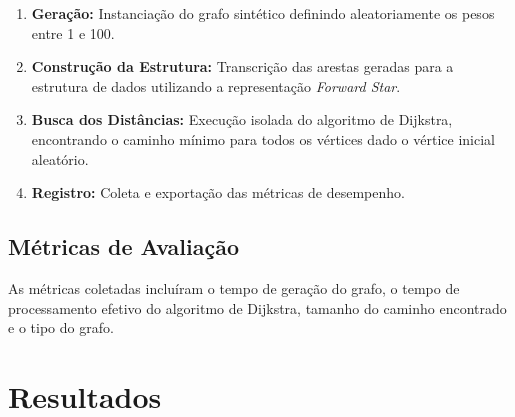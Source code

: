\documentclass[12pt]{article}
\begin{document}
\begin{enumerate}
    \item \textbf{Geração:} Instanciação do grafo sintético definindo aleatoriamente os pesos entre 1 e 100.
    
    \item \textbf{Construção da Estrutura:} Transcrição das arestas geradas para a estrutura de dados utilizando a representação \textit{Forward Star}.
    
    \item \textbf{Busca dos Distâncias:} Execução isolada do algoritmo de Dijkstra, encontrando o caminho mínimo para todos os vértices dado o vértice inicial aleatório.
    
    \item \textbf{Registro:} Coleta e exportação das métricas de desempenho.
\end{enumerate}

\subsection{Métricas de Avaliação}

As métricas coletadas incluíram o tempo de geração do grafo, o tempo de processamento efetivo do algoritmo de Dijkstra, tamanho do caminho encontrado e o tipo do grafo.

\section{Resultados} \label{resultados}

\begin{table}[ht]
\centering
\caption{Desempenho médio do Dijkstra em grafos por tipo de conectividade.}
\label{tab:resultados}
\end{table}
\end{document}
